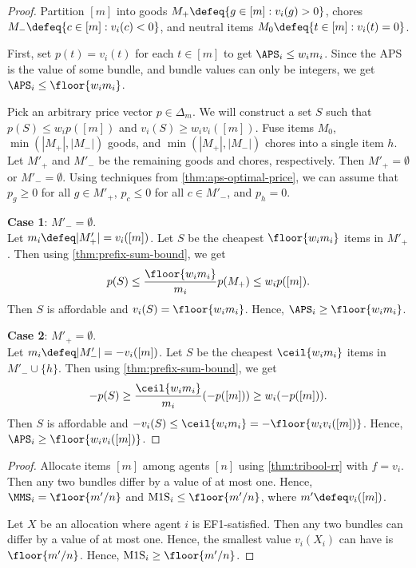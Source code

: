 \begin{proof}
Partition $[m]$ into goods $M_+ \defeq \{g \in [m]: v_i(g) > 0\}$,
chores $M_- \defeq \{c \in [m]: v_i(c) < 0\}$, and
neutral items $M_0 \defeq \{t \in [m]: v_i(t) = 0\}$.

First, set $p(t) = v_i(t)$ for each $t \in [m]$ to get $\APS_i \le w_im_i$.
Since the APS is the value of some bundle, and bundle values can only be integers,
we get $\APS_i \le \floor{w_im_i}$.

Pick an arbitrary price vector $p \in \Delta_m$.
We will construct a set $S$ such that $p(S) \le w_ip([m])$ and $v_i(S) \ge w_iv_i([m])$.
Fuse items $M_0$, $\min(|M_+|, |M_-|)$ goods, and $\min(|M_+|, |M_-|)$ chores
into a single item $h$.
Let $M'_+$ and $M'_-$ be the remaining goods and chores, respectively.
Then $M'_+ = \emptyset$ or $M'_- = \emptyset$.
Using techniques from \cref{thm:aps-optimal-price},
we can assume \wLoG{} that $p_g \ge 0$ for all $g \in M'_+$,
$p_c \le 0$ for all $c \in M'_-$, and $p_h = 0$.

\textbf{Case 1}: $M'_- = \emptyset$.
\\ Let $m_i \defeq |M'_+| = v_i([m])$.
Let $S$ be the cheapest $\floor{w_im_i}$ items in $M'_+$.
Then using \cref{thm:prefix-sum-bound}, we get
\[ p(S) \le \frac{\floor{w_im_i}}{m_i}p(M_+) \le w_ip([m]). \]
Then $S$ is affordable and $v_i(S) = \floor{w_im_i}$.
Hence, $\APS_i \ge \floor{w_im_i}$.

\textbf{Case 2}: $M'_+ = \emptyset$.
\\ Let $m_i \defeq |M'_-| = -v_i([m])$.
Let $S$ be the cheapest $\ceil{w_im_i}$ items in $M'_- \cup \{h\}$.
Then using \cref{thm:prefix-sum-bound}, we get
\[ -p(S) \ge \frac{\ceil{w_im_i}}{m_i}(-p([m])) \ge w_i(-p([m])). \]
Then $S$ is affordable and $-v_i(S) \le \ceil{w_im_i} = -\floor{w_iv_i([m])}$.
Hence, $\APS_i \ge \floor{w_iv_i([m])}$.
\end{proof}

\begin{proof}
Allocate items $[m]$ among agents $[n]$ using \cref{thm:tribool-rr} with $f = v_i$.
Then any two bundles differ by a value of at most one.
Hence, $\MMS_i = \floor{m'/n}$ and $\mathrm{M1S}_i \le \floor{m'/n}$,
where $m' \defeq v_i([m])$.

Let $X$ be an allocation where agent $i$ is EF1-satisfied.
Then any two bundles can differ by a value of at most one.
Hence, the smallest value $v_i(X_i)$ can have is $\floor{m'/n}$.
Hence, $\mathrm{M1S}_i \ge \floor{m'/n}$.
\end{proof}

